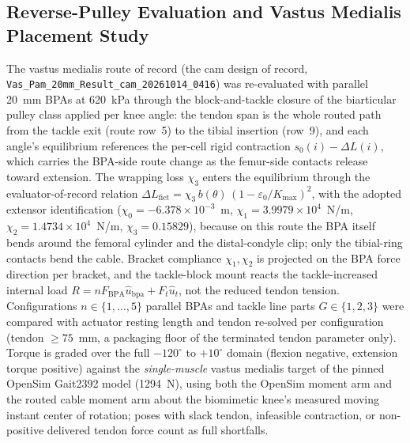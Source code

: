 
\begin{methods}
\subsection{Reverse-Pulley Evaluation and Vastus Medialis Placement Study}

The vastus medialis route of record (the cam design of record,
\texttt{Vas\_Pam\_20mm\_Result\_cam\_20261014\_0416}) was re-evaluated
with parallel 20~mm BPAs at 620~kPa through the block-and-tackle closure
of the biarticular pulley class applied per knee angle: the tendon span
is the whole routed path from the tackle exit (route row~5) to the tibial
insertion (row~9), and each angle's equilibrium references the per-cell
rigid contraction $s_0(i)-\Delta L(i)$, which carries the BPA-side route
change as the femur-side contacts release toward extension. The wrapping
loss $\chi_3$ enters the equilibrium through the evaluator-of-record
relation $\Delta L_{\mathrm{fict}} = \chi_3 \, b(\theta)\,
(1-\varepsilon_0/K_{\max})^2$, with the adopted extensor identification
($\chi_0=-6.378\times10^{-3}$~m, $\chi_1=3.9979\times10^{4}$~N/m,
$\chi_2=1.4734\times10^{4}$~N/m, $\chi_3=0.15829$), because on this
route the BPA itself bends around the femoral cylinder and the
distal-condyle clip; only the tibial-ring contacts bend the cable.
Bracket compliance $\chi_1,\chi_2$ is projected on the BPA force
direction per bracket, and the tackle-block mount reacts the
tackle-increased internal load
$R = n F_{\mathrm{BPA}} \hat{u}_{\mathrm{bpa}} + F_t \hat{u}_t$, not the
reduced tendon tension. Configurations $n \in \{1,\dots,5\}$ parallel
BPAs and tackle line parts $G \in \{1,2,3\}$ were compared with actuator
resting length and tendon re-solved per configuration (tendon
$\ge 75$~mm, a packaging floor of the terminated tendon parameter only).
Torque is graded over the full $-120^{\circ}$ to $+10^{\circ}$ domain
(flexion negative, extension torque positive) against the
\emph{single-muscle} vastus medialis target of the pinned OpenSim
Gait2392 model (1294~N), using both the OpenSim moment arm and the
routed cable moment arm about the biomimetic knee's measured moving
instant center of rotation; poses with slack tendon, infeasible
contraction, or non-positive delivered tendon force count as full
shortfalls.
\end{methods}

